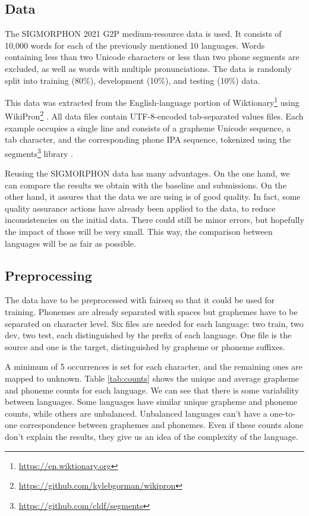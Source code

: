 \documentclass[11pt,a4paper]{article}
\begin{document}
\subsection{Data}

The SIGMORPHON 2021 G2P medium-resource data is used. It consists of 10,000 words for each of the previously mentioned 10 languages. Words containing less than two Unicode characters or less than two phone segments are excluded, as well as words with multiple pronunciations. The data is randomly split into training (80\%), development (10\%), and testing (10\%) data.

This data was extracted from the English-language portion of
Wiktionary\footnote{\url{https://en.wiktionary.org}} using
WikiPron\footnote{\url{https://github.com/kylebgorman/wikipron}} \cite{lee-etal-2020-massively}. All data files contain UTF-8-encoded tab-separated values files. Each example occupies a single line and consists of a grapheme Unicode sequence, a tab character, and the corresponding phone IPA sequence, tokenized using the segments\footnote{\url{https://github.com/cldf/segments}} library \cite{moran2018unicode}.

Reusing the SIGMORPHON data has many advantages. On the one hand, we can compare the results we obtain with the baseline and submissions. On the other hand, it assures that the data we are using is of good quality. In fact, some quality assurance actions have already been applied to the data, to reduce inconsistencies on the initial data. There could still be minor errors, but hopefully the impact of those will be very small. This way, the comparison between languages will be as fair as possible.

\subsection{Preprocessing}

The data have to be preprocessed with fairseq so that it could be used for training. Phonemes are already separated with spaces but graphemes have to be separated on character level. Six files are needed for each language: two train, two dev, two test, each distinguished by the prefix of each language. One file is the source and one is the target, distinguished by grapheme or phoneme suffixes.

A minimum of 5 occurrences is set for each character, and the remaining ones are mapped to unknown. Table \ref{tab:counts} shows the unique and average grapheme and phoneme counts for each language. We can see that there is some variability between languages. Some languages have similar unique grapheme and phoneme counts, while others are unbalanced. Unbalanced languages can't have a one-to-one correspondence between graphemes and phonemes. Even if these counts alone don't explain the results, they give us an idea of the complexity of the language.
\end{document}
